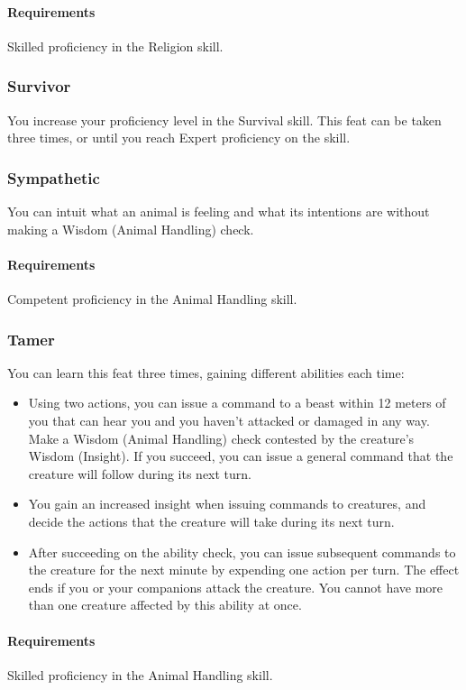     \paragraph{Requirements} Skilled proficiency in the Religion skill.
\subsubsection{Survivor} \label{feat::survivor}
    You increase your proficiency level in the Survival skill.
    This feat can be taken three times, or until you reach Expert proficiency on the skill.
\subsubsection{Sympathetic} \label{feat::sympathetic}
    You can intuit what an animal is feeling and what its intentions are without making a Wisdom (Animal Handling) check.
    \paragraph{Requirements} Competent proficiency in the Animal Handling skill.
\subsubsection{Tamer} \label{feat::tamer}
    You can learn this feat three times, gaining different abilities each time:
    \begin{itemize}
        \item Using two actions, you can issue a command to a beast within 12 meters of you that can hear you and you haven't attacked or damaged in any way.
        Make a Wisdom (Animal Handling) check contested by the creature's Wisdom (Insight).
        If you succeed, you can issue a general command that the creature will follow during its next turn.
        \item You gain an increased insight when issuing commands to creatures, and decide the actions that the creature will take during its next turn.
        \item After succeeding on the ability check, you can issue subsequent commands to the creature for the next minute by expending one action per turn.
        The effect ends if you or your companions attack the creature.
        You cannot have more than one creature affected by this ability at once.
    \end{itemize}
    \paragraph{Requirements} Skilled proficiency in the Animal Handling skill.
